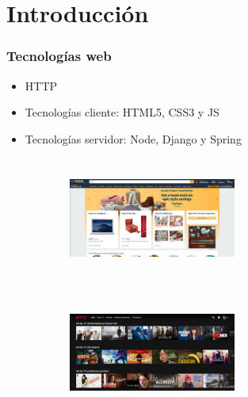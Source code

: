 \documentclass[xcolor={table}]{beamer}
\begin{document}
	\section{Introducción}
		\begin{frame}

			\frametitle{Tecnologías web}
			\begin{itemize}
			    \begin{itemize}
    			    \item HTTP
    			    \item Tecnologías cliente: HTML5, CSS3 y JS
    			    \item Tecnologías servidor: Node, Django y Spring
			    \end{itemize}{}
			\end{itemize}
			
		\begin{figure}[H]
        \centering
        \begin{subfigure}{\textwidth}
            \includegraphics[width=5.5cm, height=4cm]{img/amazon.png}
        \label{fig:amazon}
        \end{subfigure}\hfill
        \begin{subfigure}{\textwidth}
            \includegraphics[width=5.5cm, height=4cm]{img/netflix.png}
        \label{fig:netflix}
        \end{subfigure}\hfill
            \label{fig:appwebs}
            \end{figure}
		\end{frame}
		
\end{document}
